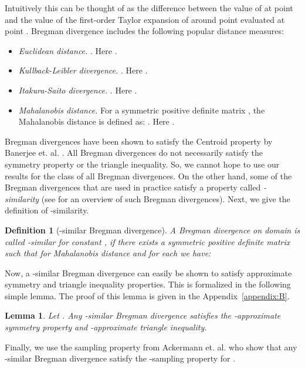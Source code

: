 \documentclass[a4paper]{article}
\newtheorem{lemma}[theorem]{Lemma}
\newtheorem{definition}[theorem]{Definition}
\begin{document}
Intuitively this can be thought of as the difference between the value of  at point  and the value of the first-order Taylor expansion of  around point  evaluated at point . Bregman divergence includes the following popular distance measures:
\begin{itemize}
\item {\em Euclidean distance.} . Here .

\item {\em Kullback-Leibler divergence.} . Here .

\item {\em Itakura-Saito divergence.} . Here .

\item {\em Mahalanobis distance.} For a symmetric positive definite matrix , the Mahalanobis distance is defined as:
.
Here .
\end{itemize}

Bregman divergences have been shown to satisfy the Centroid property by Banerjee et. al. \cite{ban05}. All Bregman divergences do not necessarily satisfy the symmetry property or the triangle inequality. So, we cannot hope to use our results for the class of all Bregman divergences. On the other hand, some of the Bregman divergences that are used in practice satisfy a property called {\em -similarity} (see \cite{a09} for an overview of such Bregman divergences). Next, we give the definition of -similarity.

\begin{definition}[-similar Bregman divergence]
A Bregman divergence  on domain  is called -similar for constant , if there exists a symmetric positive definite matrix  such that for Mahalanobis distance  and for each  we have:

\end{definition}

Now, a -similar Bregman divergence can easily be shown to satisfy approximate symmetry and triangle inequality properties. This is formalized in the following simple lemma. The proof of this lemma is given in the Appendix~\ref{appendix:B}.

\begin{lemma}\label{lemma:mu-similar}
Let . Any -similar Bregman divergence satisfies the -approximate symmetry property and -approximate triangle inequality.
\end{lemma}

Finally, we use the sampling property from Ackermann et. al. \cite{abs10} who show that any -similar Bregman divergence satisfy the -sampling property for .
\end{document}
